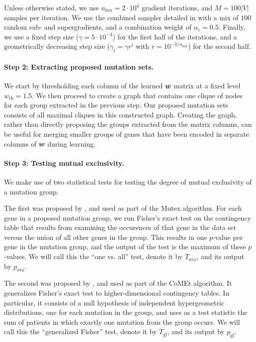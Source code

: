 Unless otherwise stated, we use $n_{\mathrm{iter}} = 2\cdot10^4$ gradient iterations, and $M = 100|V|$ samples per iteration.
We use the combined sampler detailed in  with a mix of $100$ random sub- and supergradients, and a combination weight of $\alpha_c = 0.5$.
Finally, we use a fixed step size ($\gamma = 5\cdot10^{-4}$) for the first half of the iterations, and a geometrically decreasing step size ($\gamma_i = \gamma r^i$ with $r = 10^{-3/n_{\mathrm{iter}}}$) for the second half.

\paragraph{Step 2: Extracting proposed mutation sets.}
We start by thresholding each column of the learned $\bm{w}$ matrix at a fixed level $w_{\mathrm{th}} = 1.5$.
We then proceed to create a graph that contains one clique of nodes for each group extracted in the previous step.
Our proposed mutation sets consists of all maximal cliques in this constructed graph.
Creating the graph, rather than directly proposing the groups extracted from the matrix columns, can be useful for merging smaller groups of genes that have been encoded in separate columns of $\bm{w}$ during learning.

\paragraph{Step 3: Testing mutual exclusivity.}
We make use of two statistical tests for testing the degree of mutual exclusivity of a mutation group.

The first was proposed by \cite{mutex}, and used as part of the Mutex algorithm.
For each gene in a proposed mutation group, we run Fisher's exact test on the contingency table that results from examining the occurences of that gene in the data set versus the union of all other genes in the group.
This results in one $p$-value per gene in the mutation group, and the output of the test is the maximum of these $p$-values.
We will call this the ``one vs. all'' test, denote it by $T_{\mathrm{ova}}$, and its output by $p_{\mathrm{ova}}$.

The second was proposed by \cite{comet}, and used as part of the CoMEt algorithm.
It generalizes Fisher's exact test to higher-dimensional contingency tables.
In particular, it consists of a null hypothesis of independent hypergeometric distributions, one for each mutation in the group, and uses as a test statistic the sum of patients in which exactly one mutation from the group occurs.
We will call this the ``generalized Fisher'' test, denote it by $T_{\mathrm{gf}}$, and its output by $p_{\mathrm{gf}}$.

